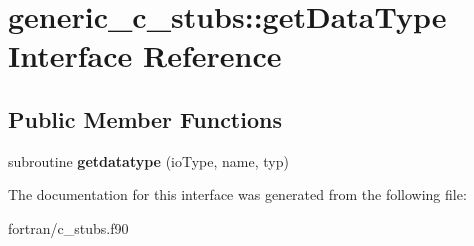 \hypertarget{interfacegeneric__c__stubs_1_1get_data_type}{}\section{generic\+\_\+c\+\_\+stubs\+:\+:get\+Data\+Type Interface Reference}
\label{interfacegeneric__c__stubs_1_1get_data_type}
\subsection*{Public Member Functions}
\begin{DoxyCompactItemize}
\item 
\mbox{\label{interfacegeneric__c__stubs_1_1get_data_type_a9a318dd6d428c5f33f668719f4ed8d00}} 
subroutine {\bfseries getdatatype} (io\+Type, name, typ)
\end{DoxyCompactItemize}


The documentation for this interface was generated from the following file\+:\begin{DoxyCompactItemize}
\item 
fortran/c\+\_\+stubs.\+f90\end{DoxyCompactItemize}
